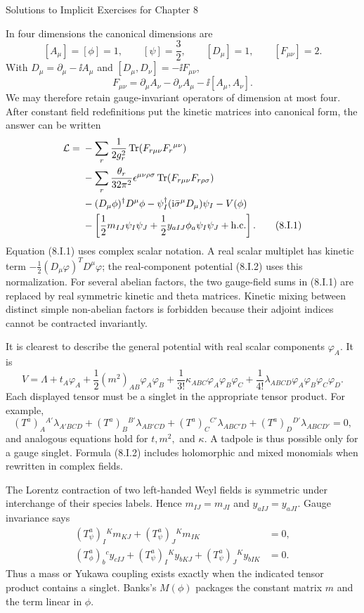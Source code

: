\begin{bankssolutions}{Solutions to Implicit Exercises for Chapter 8}

In four dimensions the canonical dimensions are
\[
 [A_\mu]=[\phi]=1,\qquad [\psi]=\frac32,
 \qquad [D_\mu]=1,\qquad [F_{\mu\nu}]=2.
\]
With $D_\mu=\partial_\mu-\ii A_\mu$ and
$[D_\mu,D_\nu]=-\ii F_{\mu\nu}$,
\[
 F_{\mu\nu}=\partial_\mu A_\nu-\partial_\nu A_\mu
 -\ii[A_\mu,A_\nu].
\]
We may therefore retain gauge-invariant operators of dimension at most four.
After constant field redefinitions put the kinetic matrices into canonical
form, the answer can be written
\begin{align*}
 \mathcal L={}&-\sum_r\frac{1}{2g_r^2}
   \operatorname{Tr}(F_{r\mu\nu}F_r{}^{\mu\nu})\\
 &-\sum_r\frac{\theta_r}{32\pi^2}
   \epsilon^{\mu\nu\rho\sigma}
   \operatorname{Tr}(F_{r\mu\nu}F_{r\rho\sigma})\\
 &-(D_\mu\phi)^\dagger D^\mu\phi
   -\psi_I^\dagger(\mathrm{i}\bar\sigma^\mu D_\mu)\psi_I
   -V(\phi)\\
 &-\left[\frac12m_{IJ}\psi_I\psi_J
   +\frac12y_{aIJ}\phi_a\psi_I\psi_J+\mathrm{h.c.}\right].
 \tag{8.I.1}
\end{align*}
Equation (8.I.1) uses complex scalar notation.  A real scalar multiplet has
kinetic term $-\tfrac12(D_\mu\varphi)^T D^\mu\varphi$; the real-component
potential (8.I.2) uses this normalization.
For several abelian factors, the two gauge-field sums in (8.I.1) are replaced
by real symmetric kinetic and theta matrices.  Kinetic mixing between distinct
simple non-abelian factors is forbidden because their adjoint indices cannot
be contracted invariantly.

It is clearest to describe the general potential with real scalar components
$\varphi_A$.  It is
\[
 V=\Lambda+t_A\varphi_A+\frac12(m^2)_{AB}\varphi_A\varphi_B
 +\frac1{3!}\kappa_{ABC}\varphi_A\varphi_B\varphi_C
 +\frac1{4!}\lambda_{ABCD}\varphi_A\varphi_B\varphi_C\varphi_D.
 \tag{8.I.2}
\]
Each displayed tensor must be a singlet in the appropriate tensor product.
For example,
\[
 (T^a)_A{}^{A'}\lambda_{A'BCD}
 +(T^a)_B{}^{B'}\lambda_{AB'CD}
 +(T^a)_C{}^{C'}\lambda_{ABC'D}
 +(T^a)_D{}^{D'}\lambda_{ABCD'}=0,
 \tag{8.I.3}
\]
and analogous equations hold for $t,m^2,$ and $\kappa$.  A tadpole is thus
possible only for a gauge singlet.  Formula (8.I.2) includes holomorphic and
mixed monomials when rewritten in complex fields.

The Lorentz contraction of two left-handed Weyl fields is symmetric under
interchange of their species labels.  Hence $m_{IJ}=m_{JI}$ and
$y_{aIJ}=y_{aJI}$.  Gauge invariance says
\begin{align*}
 (T_\psi^a)_I{}^K m_{KJ}+(T_\psi^a)_J{}^K m_{IK}&=0,\\
 (T_\phi^a)_b{}^c y_{cIJ}
 +(T_\psi^a)_I{}^K y_{bKJ}
 +(T_\psi^a)_J{}^K y_{bIK}&=0.
\end{align*}
Thus a mass or Yukawa coupling exists exactly when the indicated tensor
product contains a singlet.  Banks's $M(\phi)$ packages the constant matrix
$m$ and the term linear in $\phi$.


\end{bankssolutions}
